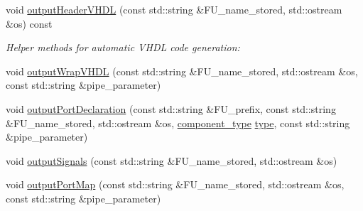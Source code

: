 \begin{DoxyCompactItemize}
void \hyperlink{classflopoco__wrapper_a7e97147311b48f0fc5d3463bc88896bf}{output\+Header\+V\+H\+DL} (const std\+::string \&F\+U\+\_\+name\+\_\+stored, std\+::ostream \&os) const
\begin{DoxyCompactList}\small\item\em Helper methods for automatic V\+H\+DL code generation\+: \end{DoxyCompactList}\item 
void \hyperlink{classflopoco__wrapper_ad0575cadd6eee1f9c3bcdac90eb05b0e}{output\+Wrap\+V\+H\+DL} (const std\+::string \&F\+U\+\_\+name\+\_\+stored, std\+::ostream \&os, const std\+::string \&pipe\+\_\+parameter)
\item 
void \hyperlink{classflopoco__wrapper_a121477e55d07d3d493c879d80ddb5770}{output\+Port\+Declaration} (const std\+::string \&F\+U\+\_\+prefix, const std\+::string \&F\+U\+\_\+name\+\_\+stored, std\+::ostream \&os, \hyperlink{classflopoco__wrapper_a143045f6fc28429886895b54849d901d}{component\+\_\+type} \hyperlink{classflopoco__wrapper_aa187461f66472ae2d77d3c8425895de7}{type}, const std\+::string \&pipe\+\_\+parameter)
\item 
void \hyperlink{classflopoco__wrapper_a1220164a60b0fbd7e1257e1401dd0897}{output\+Signals} (const std\+::string \&F\+U\+\_\+name\+\_\+stored, std\+::ostream \&os)
\item 
void \hyperlink{classflopoco__wrapper_aeaeed1e93ec604948ffff0085503cd3b}{output\+Port\+Map} (const std\+::string \&F\+U\+\_\+name\+\_\+stored, std\+::ostream \&os, const std\+::string \&pipe\+\_\+parameter)
\end{DoxyCompactItemize}
